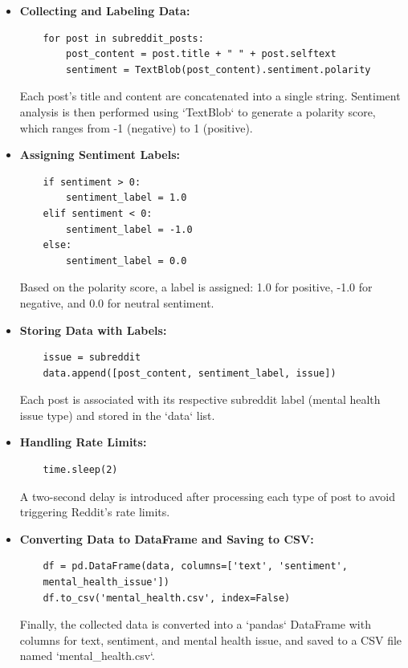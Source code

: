\begin{itemize}
    \item \textbf{Collecting and Labeling Data:}
    \begin{verbatim}
    for post in subreddit_posts:
        post_content = post.title + " " + post.selftext
        sentiment = TextBlob(post_content).sentiment.polarity
    \end{verbatim}
    \noindent
    Each post’s title and content are concatenated into a single string. Sentiment analysis is then performed using `TextBlob` to generate a polarity score, which ranges from -1 (negative) to 1 (positive).

    \item \textbf{Assigning Sentiment Labels:}
    \begin{verbatim}
    if sentiment > 0:
        sentiment_label = 1.0
    elif sentiment < 0:
        sentiment_label = -1.0
    else:
        sentiment_label = 0.0
    \end{verbatim}
    \noindent
    Based on the polarity score, a label is assigned: 1.0 for positive, -1.0 for negative, and 0.0 for neutral sentiment.

    \item \textbf{Storing Data with Labels:}
    \begin{verbatim}
    issue = subreddit
    data.append([post_content, sentiment_label, issue])
    \end{verbatim}
    \noindent
    Each post is associated with its respective subreddit label (mental health issue type) and stored in the `data` list.

    \item \textbf{Handling Rate Limits:}
    \begin{verbatim}
    time.sleep(2)
    \end{verbatim}
    \noindent
    A two-second delay is introduced after processing each type of post to avoid triggering Reddit’s rate limits.

    \item \textbf{Converting Data to DataFrame and Saving to CSV:}
    \begin{verbatim}
    df = pd.DataFrame(data, columns=['text', 'sentiment', 
    mental_health_issue'])
    df.to_csv('mental_health.csv', index=False)
    \end{verbatim}
    \noindent
    Finally, the collected data is converted into a `pandas` DataFrame with columns for text, sentiment, and mental health issue, and saved to a CSV file named `mental\_health.csv`.
\end{itemize}

